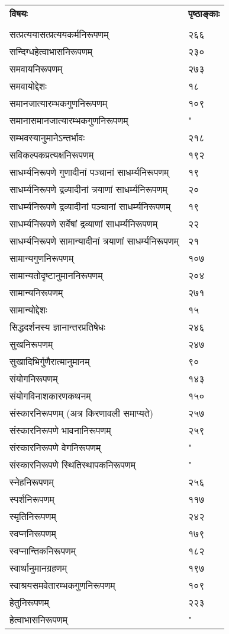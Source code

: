 \documentclass[11pt, openany]{book}
\begin{document}
\newpage
\noindent
\begin{tabular}{m{28em} m{2em}}
\textbf{विषयः} & \textbf{पृष्ठाङ्काः}\\
 &\\ 
 सत्प्रत्ययासत्प्रत्ययकर्मनिरूपणम् &२६६\\
सन्दिग्धहेत्वाभासनिरूपणम् &२३०\\
समवायनिरूपणम् &२७३\\
समवायोद्देशः &१८\\
समानजात्यारम्भकगुणनिरूपणम् &१०९\\
समानासमानजात्यारम्भकगुणनिरूपणम् &"\\
सम्भवस्यानुमानेऽन्तर्भावः &२१८\\
सविकल्पकप्रत्यक्षनिरूपणम् &१९२\\
साधर्म्यनिरूपणे गुणादीनां पञ्चानां साधर्म्यनिरूपणम् &१९\\
साधर्म्यनिरूपणे द्रव्यादीनां त्रयाणां साधर्म्यनिरूपणम् &२०\\
साधर्म्यनिरूपणे द्रव्यादीनां पञ्चानां साधर्म्यनिरूपणम् &१९\\
साधर्म्यनिरूपणे सर्वेषां द्रव्याणां साधर्म्यनिरूपणम् &२२\\
साधर्म्यनिरूपणे सामान्यादीनां त्रयाणां साधर्म्यनिरूपणम् &२१\\
सामान्यगुणनिरूपणम् &१०७\\
सामान्यतोदृष्टानुमाननिरूपणम् &२०४\\
सामान्यनिरूपणम् &२७१\\
सामान्योद्देशः &१५\\
सिद्धदर्शनस्य ज्ञानान्तरप्रतिषेधः &२४६\\
सुखनिरूपणम् &२४७\\
सुखादिभिर्गुणैरात्मानुमानम् &९०\\
संयोगनिरूपणम् &१४३\\
संयोगविनाशकारणकथनम् &१५०\\
संस्कारनिरूपणम् (अत्र किरणावली समाप्यते) &२५७\\
संस्कारनिरूपणे भावनानिरूपणम् &२५९\\
संस्कारनिरूपणे वेगनिरूपणम् &"\\
संस्कारनिरूपणे स्थितिस्थापकनिरूपणम् &"\\
स्नेहनिरूपणम् &२५६\\
स्पर्शनिरूपणम् &११७\\
स्मृतिनिरूपणम् &२४२\\
स्वप्ननिरूपणम् &१७९\\
स्वप्नान्तिकनिरूपणम् &१८२\\
स्वार्थानुमानग्रहणम् &१९७\\
स्वाश्रयसमवेतारम्भकगुणनिरूपणम् &१०९\\
हेतुनिरूपणम् &२२३\\
हेत्वाभासनिरूपणम् &"
\end{tabular}
\end{document}

